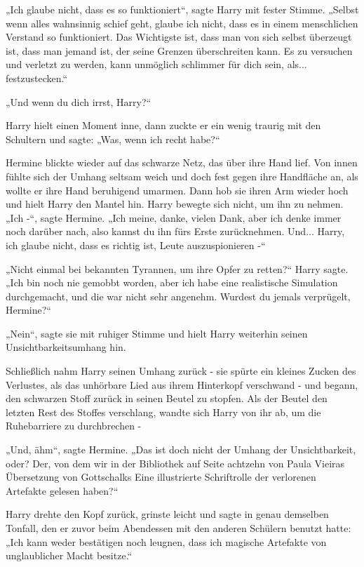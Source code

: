 {„Ich glaube nicht, dass es so funktioniert“, sagte Harry mit fester Stimme. „Selbst wenn alles wahnsinnig schief geht, glaube ich nicht, dass es in einem menschlichen Verstand so funktioniert. Das Wichtigste ist, dass man von sich selbst überzeugt ist, dass man jemand ist, der seine Grenzen überschreiten kann. Es zu versuchen und verletzt zu werden, kann unmöglich schlimmer für dich sein, als... festzustecken.“

„Und wenn du dich irrst, Harry?“

Harry hielt einen Moment inne, dann zuckte er ein wenig traurig mit den Schultern und sagte: „Was, wenn ich recht habe?“

Hermine blickte wieder auf das schwarze Netz, das über ihre Hand lief. Von innen fühlte sich der Umhang seltsam weich und doch fest gegen ihre Handfläche an, als wollte er ihre Hand beruhigend umarmen. Dann hob sie ihren Arm wieder hoch und hielt Harry den Mantel hin. Harry bewegte sich nicht, um ihn zu nehmen. „Ich -“, sagte Hermine. „Ich meine, danke, vielen Dank, aber ich denke immer noch darüber nach, also kannst du ihn fürs Erste zurücknehmen. Und... Harry, ich glaube nicht, dass es richtig ist, Leute auszuspionieren -“

„Nicht einmal bei bekannten Tyrannen, um ihre Opfer zu retten?“ Harry sagte. „Ich bin noch nie gemobbt worden, aber ich habe eine realistische Simulation durchgemacht, und die war nicht sehr angenehm. Wurdest du jemals verprügelt, Hermine?“

„Nein“, sagte sie mit ruhiger Stimme und hielt Harry weiterhin seinen Unsichtbarkeitsumhang hin.

Schließlich nahm Harry seinen Umhang zurück - sie spürte ein kleines Zucken des Verlustes, als das unhörbare Lied aus ihrem Hinterkopf verschwand - und begann, den schwarzen Stoff zurück in seinen Beutel zu stopfen. Als der Beutel den letzten Rest des Stoffes verschlang, wandte sich Harry von ihr ab, um die Ruhebarriere zu durchbrechen -

„Und, ähm“, sagte Hermine. „Das ist doch nicht der Umhang der Unsichtbarkeit, oder? Der, von dem wir in der Bibliothek auf Seite achtzehn von Paula Vieiras Übersetzung von Gottschalks Eine illustrierte Schriftrolle der verlorenen Artefakte gelesen haben?“

Harry drehte den Kopf zurück, grinste leicht und sagte in genau demselben Tonfall, den er zuvor beim Abendessen mit den anderen Schülern benutzt hatte: „Ich kann weder bestätigen noch leugnen, dass ich magische Artefakte von unglaublicher Macht besitze.“

}
